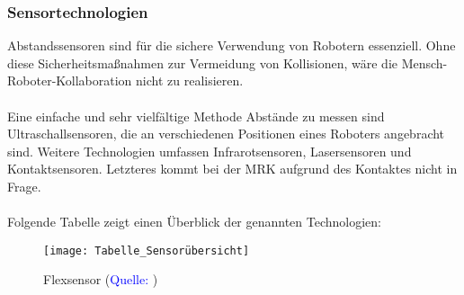 \documentclass[titlepage,12pt,twoside]{article}
\begin{document}
\subsubsection{Sensortechnologien}
Abstandssensoren sind für die sichere Verwendung von Robotern essenziell. Ohne 
diese Sicherheitsmaßnahmen zur Vermeidung von Kollisionen, wäre die 
Mensch-Roboter-Kollaboration nicht zu realisieren. \\
\\
Eine einfache und sehr vielfältige Methode Abstände zu messen sind 
Ultraschallsensoren, die an verschiedenen Positionen eines Roboters angebracht 
sind. Weitere Technologien umfassen Infrarotsensoren, Lasersensoren und 
Kontaktsensoren. Letzteres kommt bei der MRK aufgrund des Kontaktes nicht in 
Frage. \\
\\
Folgende Tabelle zeigt einen Überblick der genannten Technologien: \\
\begin{figure}[H]
	\begin{center}
		\scalebox{1.2}
		{\texttt{[image: Tabelle\_Sensorübersicht]}}
		\caption{Flexsensor (\textcolor{blue}{Quelle: \cite{Generationrobots}})}
		\label{fig:Tabelle_Sensorübersicht}
	\end{center}
\end{figure}
\hfill \break
\end{document}
